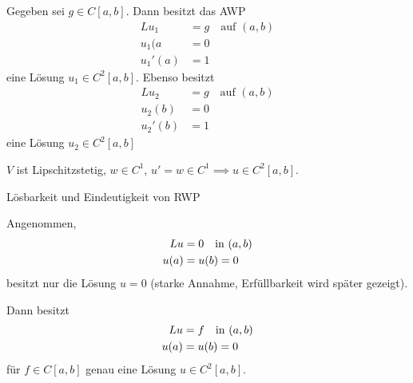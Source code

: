 \begin{folgerung}\label{fol:2-2}
  Gegeben sei $g \in C[a, b]$. Dann besitzt das AWP
  \begin{align*}
    L u_{1} &= g \quad \text{auf } (a, b)\\
    u_{1}(a &=0\\
    u_{1}'(a) &=1
  \end{align*}
eine Lösung $u_{1} \in C^{2}[a, b]$. Ebenso besitzt 
  \begin{align*}
    L u_{2} &= g \quad \text{auf } (a, b)\\
    u_{2}(b) &=0\\
    u_{2}'(b) &=1
  \end{align*}
eine Lösung $u_{2} \in C^{2}[a, b]$
\end{folgerung}
\begin{beweis}
  $V$ ist Lipschitzstetig, $w \in C^{1}$, $u' = w \in C^{1} \implies u \in C^{2}[a, b]$. 
\end{beweis}
\begin{satz}\label{thm:2-3}Lösbarkeit und Eindeutigkeit von RWP

Angenommen,
\begin{align}\label{eq:2-3}
    L u &= 0 \quad \text{in } (a, b)\\
    u(a) &= u(b) =0 \notag
\end{align}
besitzt nur die Lösung $u = 0$ (starke Annahme, Erfüllbarkeit wird später gezeigt).   

Dann besitzt
\begin{align}\label{eq:2-4}
  L u &= f \quad \text{in } (a, b)\\
  u(a) &= u(b) =0 \notag
\end{align}
für $f \in C[a, b]$ genau eine Lösung $u \in C^{2}[a, b]$. 
\end{satz}
